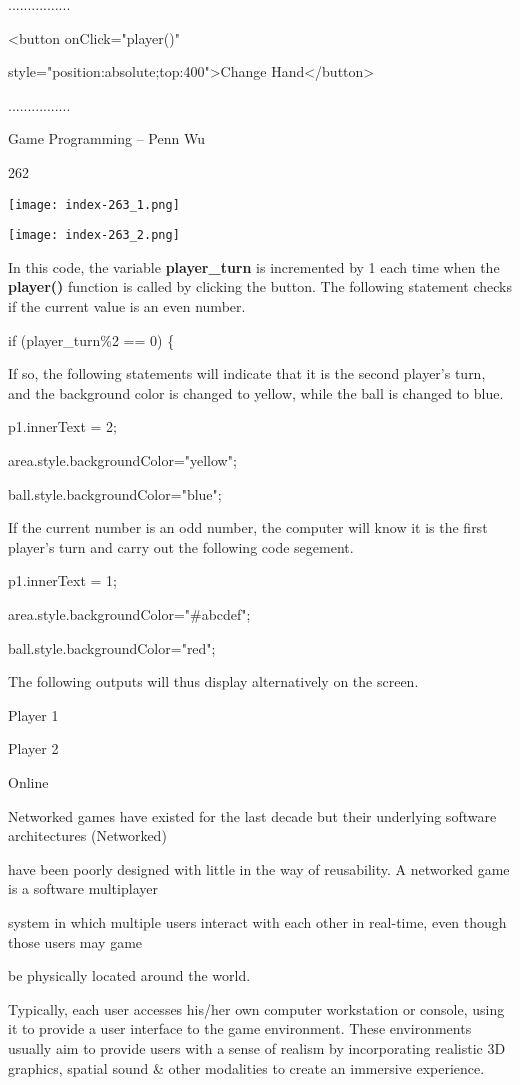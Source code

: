 \documentclass[
]{article}
\begin{document}
................

\textless button onClick="player()"

style="position:absolute;top:400"\textgreater Change
Hand\textless/button\textgreater{}

................

Game Programming -- Penn Wu

262

\protect\hypertarget{index_split_014.htmlux5cux23p263}{}{}\texttt{[image: index-263\_1.png]}

\texttt{[image: index-263\_2.png]}

In this code, the variable \textbf{player\_turn} is incremented by 1
each time when the \textbf{player()} function is called by clicking the
button. The following statement checks if the current value is an even
number.

if (player\_turn\%2 == 0) \{

If so, the following statements will indicate that it is the second
player's turn, and the background color is changed to yellow, while the
ball is changed to blue.

p1.innerText = 2;

area.style.backgroundColor="yellow";

ball.style.backgroundColor="blue";

If the current number is an odd number, the computer will know it is the
first player's turn and carry out the following code segement.

p1.innerText = 1;

area.style.backgroundColor="\#abcdef";

ball.style.backgroundColor="red";

The following outputs will thus display alternatively on the screen.

Player 1

Player 2

Online

Networked games have existed for the last decade but their underlying
software architectures (Networked)

have been poorly designed with little in the way of reusability. A
networked game is a software multiplayer

system in which multiple users interact with each other in real-time,
even though those users may game

be physically located around the world.

Typically, each user accesses his/her own computer workstation or
console, using it to provide a user interface to the game environment.
These environments usually aim to provide users with a sense of realism
by incorporating realistic 3D graphics, spatial sound \& other
modalities to create an immersive experience.
\end{document}
